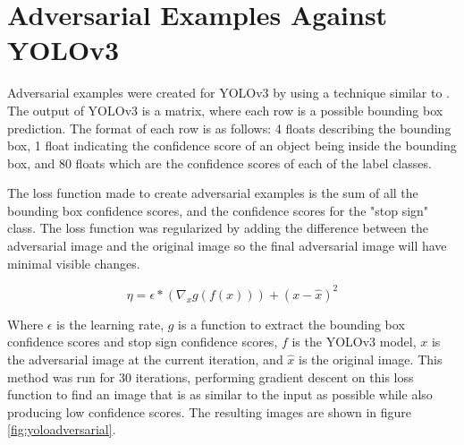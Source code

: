 \documentclass{article}
\begin{document}
\section{Adversarial Examples Against YOLOv3}

Adversarial examples were created for YOLOv3 \cite{redmon2018yolov3} by using a technique similar to \cite{goodfellow2015explaining}. The output of YOLOv3 is a matrix, where each row is a possible bounding box prediction. The format of each row is as follows: 4 floats describing the bounding box, 1 float indicating the confidence score of an object being inside the bounding box, and 80 floats which are the confidence scores of each of the label classes.

The loss function made to create adversarial examples is the sum of all the bounding box confidence scores, and the confidence scores for the "stop sign" class. The loss function was regularized by adding the difference between the adversarial image and the original image so the final adversarial image will have minimal visible changes.

\begin{equation}
    \eta = \epsilon * (\nabla_{x}g(f(x))) + (x - \hat{x})^2
\end{equation}

Where $\epsilon$ is the learning rate, $g$ is a function to extract the bounding box confidence scores and stop sign confidence scores, $f$ is the YOLOv3 model, $x$ is the adversarial image at the current iteration, and $\hat{x}$ is the original image. This method was run for 30 iterations, performing gradient descent on this loss function to find an image that is as similar to the input as possible while also producing low confidence scores. The resulting images are shown in figure \ref{fig:yoloadversarial}.
\end{document}
